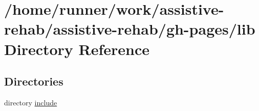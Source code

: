 \section{/home/runner/work/assistive-\/rehab/assistive-\/rehab/gh-\/pages/lib Directory Reference}
\label{dir_97aefd0d527b934f1d99a682da8fe6a9}
\subsection*{Directories}
\begin{DoxyCompactItemize}
\item 
directory \hyperlink{dir_5a30104352ef4255dc24354b02eb2d20}{include}
\end{DoxyCompactItemize}

